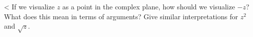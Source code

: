 <%
If we visualize $z$ as a point in the complex plane, how should we visualize $-z$? What does this mean
in terms of arguments? Give similar interpretations for $z^2$ and $\sqrt{z}$.
